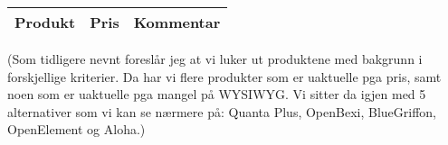 \newpage
\begin{center}
\begin{tabular}{ | m{4cm} | m{2cm}| m{8cm} | } 
\hline
\textbf{Produkt} & \textbf{Pris} & \textbf{Kommentar} \\
\hline





\end{tabular}
\end{center}

(Som tidligere nevnt foreslår jeg at vi luker ut produktene med bakgrunn i forskjellige kriterier. Da har vi flere produkter som er uaktuelle pga pris, samt noen som er uaktuelle pga mangel på WYSIWYG. Vi sitter da igjen med 5 alternativer som vi kan se nærmere på: Quanta Plus, OpenBexi, BlueGriffon, OpenElement og Aloha.)

\newpage
